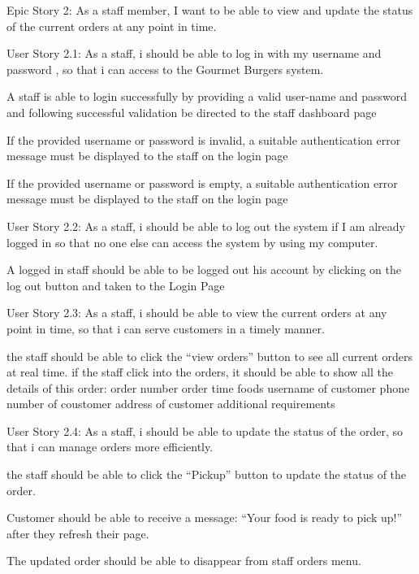 Epic Story 2:
As a staff member, I want to be able to view and update the status of the current orders at any point in time.

User Story 2.1:
As a staff, i should be able to log in with my username and password , so that i can access to the Gourmet Burgers system.
\bi
\item A staff is able to login successfully by providing a valid user-name and password and following successful validation be directed to the staff dashboard page
\item If the provided username or password is invalid, a suitable authentication error message must be displayed to the staff on the login page
\item If the provided username or password is empty, a suitable authentication error message must be displayed to the staff on the login page

User Story 2.2:
As a staff, i should be able to log out the system if I am already logged in so that no one else can access the system by using my computer.
\bi
\item A logged in staff should be able to be logged out his account by clicking on the log out button and taken to the Login Page

User Story 2.3:
As a staff, i should be able to view the current orders at any point in time, so that i can serve customers in a timely manner.
\bi
\item the staff should be able to click the “view orders” button to see all current orders at real time.
if the staff click into the orders, it should be able to show all the details of this order:
order number
order time
foods
username of customer
phone number of coustomer
address of customer
additional requirements 

User Story 2.4:
As a staff, i should be able to update the status of the order, so that i can manage orders more efficiently.
\bi
\item the staff should be able to click the “Pickup” button to update the status of the order.
\item Customer should be able to receive a message: “Your food is ready to pick up!” after they refresh their page.
\item The updated order should be able to disappear from staff orders menu.
